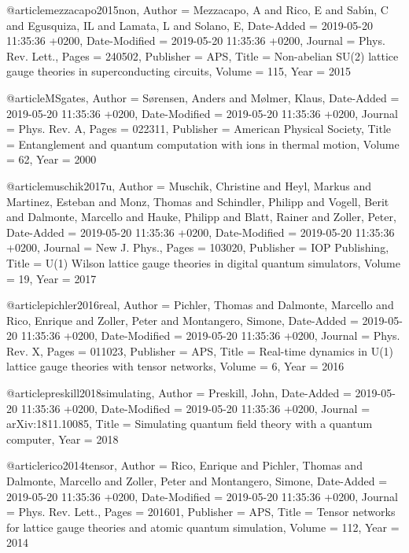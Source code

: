 \documentclass[epj,final]{svjour}
\begin{document}
@article{mezzacapo2015non,
	Author = {Mezzacapo, A and Rico, E and Sab{\'\i}n, C and Egusquiza, IL and Lamata, L and Solano, E},
	Date-Added = {2019-05-20 11:35:36 +0200},
	Date-Modified = {2019-05-20 11:35:36 +0200},
	Journal = {Phys. Rev. Lett.},
	Pages = {240502},
	Publisher = {APS},
	Title = {Non-abelian {SU(2)} lattice gauge theories in superconducting circuits},
	Volume = {115},
	Year = {2015}}

@article{MSgates,
	Author = {S{\o}rensen, Anders and M{\o}lmer, Klaus},
	Date-Added = {2019-05-20 11:35:36 +0200},
	Date-Modified = {2019-05-20 11:35:36 +0200},
	Journal = {Phys. Rev. A},
	Pages = {022311},
	Publisher = {American Physical Society},
	Title = {{Entanglement and quantum computation with ions in thermal motion}},
	Volume = {62},
	Year = {2000}}

@article{muschik2017u,
	Author = {Muschik, Christine and Heyl, Markus and Martinez, Esteban and Monz, Thomas and Schindler, Philipp and Vogell, Berit and Dalmonte, Marcello and Hauke, Philipp and Blatt, Rainer and Zoller, Peter},
	Date-Added = {2019-05-20 11:35:36 +0200},
	Date-Modified = {2019-05-20 11:35:36 +0200},
	Journal = {New J. Phys.},
	Pages = {103020},
	Publisher = {IOP Publishing},
	Title = {{U(1)} {Wilson} lattice gauge theories in digital quantum simulators},
	Volume = {19},
	Year = {2017}}

@article{pichler2016real,
	Author = {Pichler, Thomas and Dalmonte, Marcello and Rico, Enrique and Zoller, Peter and Montangero, Simone},
	Date-Added = {2019-05-20 11:35:36 +0200},
	Date-Modified = {2019-05-20 11:35:36 +0200},
	Journal = {Phys. Rev. X},
	Pages = {011023},
	Publisher = {APS},
	Title = {Real-time dynamics in {U(1)} lattice gauge theories with tensor networks},
	Volume = {6},
	Year = {2016}}

@article{preskill2018simulating,
	Author = {Preskill, John},
	Date-Added = {2019-05-20 11:35:36 +0200},
	Date-Modified = {2019-05-20 11:35:36 +0200},
	Journal = {arXiv:1811.10085},
	Title = {Simulating quantum field theory with a quantum computer},
	Year = {2018}}

@article{rico2014tensor,
	Author = {Rico, Enrique and Pichler, Thomas and Dalmonte, Marcello and Zoller, Peter and Montangero, Simone},
	Date-Added = {2019-05-20 11:35:36 +0200},
	Date-Modified = {2019-05-20 11:35:36 +0200},
	Journal = {Phys. Rev. Lett.},
	Pages = {201601},
	Publisher = {APS},
	Title = {Tensor networks for lattice gauge theories and atomic quantum simulation},
	Volume = {112},
	Year = {2014}}
\end{document}
